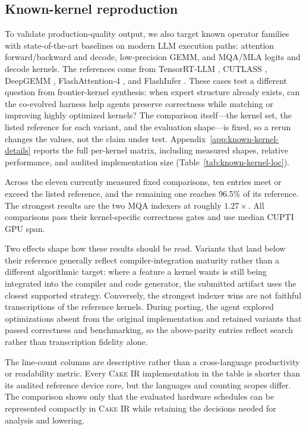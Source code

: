 \documentclass[11pt]{article}
\newcommand{\cakeir}{\textsc{Cake IR}}
\begin{document}
\FloatBarrier
\subsection{Known-kernel reproduction}
\label{sec:eval-known}

To validate production-quality output, we also target known operator families
with state-of-the-art baselines on modern LLM execution paths: attention
forward/backward and decode, low-precision GEMM, and MQA/MLA logits and decode
kernels. The references come from TensorRT-LLM \cite{tensorrtllm}, CUTLASS
\cite{cutlass}, DeepGEMM \cite{deepgemm2025}, FlashAttention-4
\cite{zadouri2026flashattention4algorithmkernelpipelining}, and FlashInfer
\cite{flashinfer}. These cases test a different question from frontier-kernel
synthesis: when expert structure already exists, can the co-evolved harness help
agents preserve correctness while matching or improving highly optimized
kernels? The comparison itself---the kernel set, the listed reference for each
variant, and the evaluation shape---is fixed, so a rerun changes the values, not
the claim under test. Appendix~\ref{app:known-kernel-details} reports the full
per-kernel matrix, including measured shapes, relative performance, and audited
implementation size (Table~\ref{tab:known-kernel-loc}).


Across the eleven currently measured fixed comparisons, ten entries meet or
exceed the listed reference, and the remaining one reaches 96.5\% of its
reference. The strongest results are the two MQA indexers at roughly
$1.27\times$. All comparisons pass their kernel-specific correctness gates and
use median CUPTI GPU span.

Two effects shape how these results should be read. Variants that land below
their reference generally reflect compiler-integration maturity rather than a
different algorithmic target: where a feature a kernel wants is still being
integrated into the compiler and code generator, the submitted artifact uses
the closest supported strategy. Conversely, the strongest indexer wins are not
faithful transcriptions of the reference kernels. During porting, the agent
explored optimizations absent from the original implementation and retained
variants that passed correctness and benchmarking, so the above-parity entries
reflect search rather than transcription fidelity alone.

The line-count columns are descriptive rather than a cross-language
productivity or readability metric. Every \cakeir{} implementation in the table
is shorter than its audited reference device core, but the languages and
counting scopes differ. The comparison shows only that the evaluated hardware
schedules can be represented compactly in \cakeir{} while retaining the
decisions needed for analysis and lowering.
\end{document}
